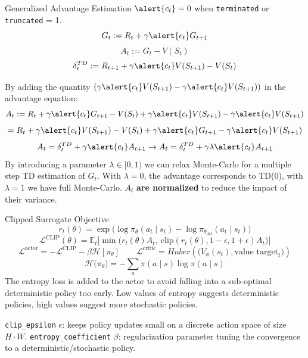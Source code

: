 \begin{frame}{Generalized Advantage Estimation \parencite{schulman2016gae}}
  $\alert{c_t} = 0$ when \texttt{terminated}
  or \texttt{truncated} = 1.
  \[
    G_{t} := R_{t} + \gamma \alert{c_t}G_{t+1}
  \]
  \[
    A_{t} := G_{t} - V(S_t)
  \]
  \[
    \delta_{t}^{TD} := R_{t+1} + \gamma \alert{c_t}V(S_{t+1}) - V(S_t)
  \]

  By adding the quantity $(\gamma \alert{c_t} V(S_{t+1}) - \gamma \alert{c_t} V(S_{t+1}))$
  in the advantage equation:
  \[
    A_{t} := R_{t} + \gamma \alert{c_t}G_{t+1} - V(S_t) + \gamma \alert{c_t} V(S_{t+1}) - \gamma \alert{c_t} V(S_{t+1})
  \]
  \[
    = R_{t} + \gamma \alert{c_t} V(S_{t+1}) - V(S_t) + \gamma \alert{c_t}G_{t+1} - \gamma \alert{c_t} V(S_{t+1})
  \]
  \[
    A_t = \delta_{t}^{TD} + \gamma \alert{c_t}A_{t+1} \rightarrow A_t = \delta_{t}^{TD} + \gamma \lambda \alert{c_t} A_{t+1}
  \]
  By introducing a parameter $\lambda \in [0,1) $ we can relax Monte-Carlo for a multiple step
  TD estimation of $G_t$. With $\lambda = 0 $, the advantage corresponds to TD(0), with
  $\lambda = 1$ we have full Monte-Carlo. $A_t$ \textbf{are normalized} to reduce the impact of their variance.
\end{frame}

\begin{frame}{Clipped Surrogate Objective}
  \[
    r_t(\theta) = \exp\!\big(\log \pi_\theta(a_t\mid s_t) - \log \pi_{\theta_{\text{old}}}(a_t\mid s_t)\big)
  \]
  \[
    \mathcal{L}^{\text{CLIP}}(\theta) = \mathbb{E}_t\Big[\min\big(r_t(\theta)A_t,\ \text{clip}(r_t(\theta), 1{-}\epsilon, 1{+}\epsilon)A_t\big)\Big]
  \]
  \[
    \mathcal{L}^{\text{actor}} = -\mathcal{L}^{\text{CLIP}} - \beta \mathcal{H}[\pi_\theta]
    \qquad
    \mathcal{L}^{\text{critic}} = Huber(\big(V_\phi(s_t), \text{value target}_t\big))
  \]
  \[
    \mathcal{H}\bigl(\pi_{\theta}\bigr)
    =
    -\sum_{a} \pi(a \mid s)\log \pi(a \mid s)
  \]
  The entropy loss is added to the actor to avoid falling into a sub-optimal
  deterministic policy too early. Low values of entropy suggests deterministic policies,
  high values suggest more stochastic policies.

  \texttt{clip\_epsilon} $\epsilon$: keeps policy updates
  small on a discrete action space of size $H{\cdot}W$. \texttt{entropy\_coefficient} $\beta$: regularization parameter tuning the convergence
  to a deterministic/stochastic policy.

\end{frame}

